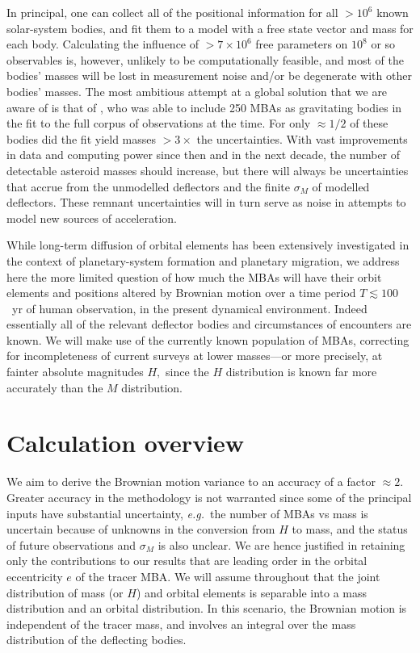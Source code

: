 \documentclass[linenumbers, onecolumn]{aastex631}
\newcommand{\eg}{\textit{e.g.\/}}
\newcommand\edited[1]{{\color{red} {#1}}}
\begin{document}
In principal, one can collect all of the positional information for
all $>10^6$ known solar-system bodies, and fit them to a model with
a free state vector and mass for each body.  Calculating the influence
of $>7\times10^6$ free parameters on $10^8$ or so observables is,
however, unlikely to be computationally feasible, and most of the
bodies' masses will be lost in measurement noise and/or be degenerate
with other bodies' masses.  The most ambitious attempt at a global
solution that we are aware of is that of \citet{goffin}, who was able
to include 250 MBAs as gravitating bodies in the fit to the full
corpus of observations at the time.  For only $\approx 1/2$ of these
bodies did the fit yield masses $>3\times$ the uncertainties.  With
vast improvements in data and computing power since then and in the
next decade, the number of detectable
asteroid masses should increase, but there will always be
uncertainties that accrue from the unmodelled deflectors and the
finite $\sigma_M$ of modelled deflectors.  These remnant uncertainties
will in turn serve as noise in attempts to model new sources of
acceleration.

While long-term diffusion of orbital elements has been extensively
investigated in the context of planetary-system formation and
planetary migration, we address here the more limited question of how
much the MBAs will have their orbit elements and positions altered
by Brownian motion over a time period $T \lesssim100$~yr of human
observation, in the present dynamical environment.  Indeed essentially
all of the relevant deflector bodies and circumstances of encounters
are known.  We will make use
of the currently known population of MBAs, correcting for
incompleteness of current surveys at lower masses---or more precisely,
at fainter absolute magnitudes $H,$ since the $H$ distribution is
known far more accurately than the $M$ distribution.


\section{Calculation overview}
We aim to derive the Brownian motion variance to an accuracy of a
factor $\approx 2.$
Greater accuracy in the \edited{methodology is not warranted
since some of the principal inputs have substantial uncertainty, \eg\ the}
number of MBAs vs mass is 
uncertain because of unknowns in the conversion
from $H$ to mass, and the status of future observations and $\sigma_M$ is
also unclear.  We are hence justified in retaining only the
contributions to our results that are leading
order in the orbital eccentricity $e$ of the tracer MBA.
We will assume throughout that the joint
distribution of mass (or $H$) and orbital elements is separable into a
mass distribution and an orbital distribution.  In this scenario, the
Brownian motion is independent of the tracer mass, and involves an
integral over the mass distribution of the deflecting bodies.
\end{document}
